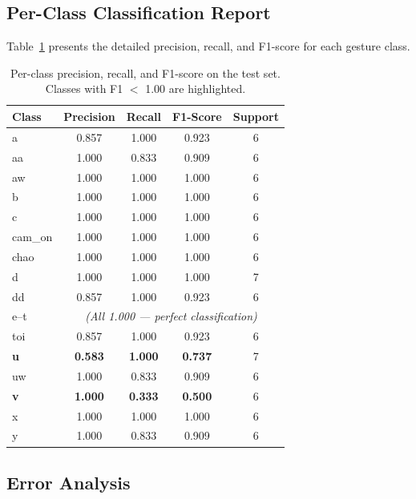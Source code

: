 \documentclass[12pt, a4paper]{article}
\begin{document}
\subsection{Per-Class Classification Report}

Table~\ref{tab:per_class} presents the detailed precision, recall, and F1-score for each gesture class.

\begin{table}[H]
    \centering
    \caption{Per-class precision, recall, and F1-score on the test set. Classes with F1 $<$ 1.00 are highlighted.}
    \label{tab:per_class}
    \small
    \begin{tabular}{lcccc}
        \toprule
        \textbf{Class} & \textbf{Precision} & \textbf{Recall} & \textbf{F1-Score} & \textbf{Support} \\
        \midrule
        a      & 0.857 & 1.000 & 0.923 & 6 \\
        aa     & 1.000 & 0.833 & 0.909 & 6 \\
        aw     & 1.000 & 1.000 & 1.000 & 6 \\
        b      & 1.000 & 1.000 & 1.000 & 6 \\
        c      & 1.000 & 1.000 & 1.000 & 6 \\
        cam\_on & 1.000 & 1.000 & 1.000 & 6 \\
        chao   & 1.000 & 1.000 & 1.000 & 6 \\
        d      & 1.000 & 1.000 & 1.000 & 7 \\
        dd     & 0.857 & 1.000 & 0.923 & 6 \\
        e--t   & \multicolumn{4}{c}{\textit{(All 1.000 --- perfect classification)}} \\
        toi    & 0.857 & 1.000 & 0.923 & 6 \\
        \textbf{u} & \textbf{0.583} & \textbf{1.000} & \textbf{0.737} & 7 \\
        uw     & 1.000 & 0.833 & 0.909 & 6 \\
        \textbf{v} & \textbf{1.000} & \textbf{0.333} & \textbf{0.500} & 6 \\
        x      & 1.000 & 1.000 & 1.000 & 6 \\
        y      & 1.000 & 0.833 & 0.909 & 6 \\
        \bottomrule
    \end{tabular}
\end{table}

\subsection{Error Analysis}
\end{document}
